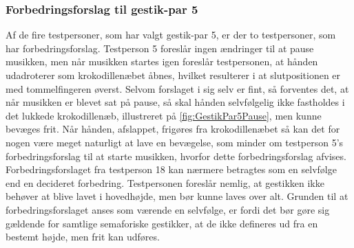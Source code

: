 \subsubsection{Forbedringsforslag til gestik-par 5}
\label{TestresultaterValgAfGestikkerForbedringGP5}
%
Af de fire testpersoner, som har valgt gestik-par 5, er der to testpersoner, som har forbedringsforslag. Testperson 5 foreslår ingen ændringer til at pause musikken, men når musikken startes igen foreslår testpersonen, at hånden udadroterer som krokodillenæbet åbnes, hvilket resulterer i at slutpositionen er med tommelfingeren øverst. Selvom forslaget i sig selv er fint, så forventes det, at når musikken er blevet sat på pause, så skal hånden selvfølgelig ikke fastholdes i det lukkede krokodillenæb, illustreret på \autoref{fig:GestikPar5Pause}, men kunne bevæges frit. Når hånden, afslappet, frigøres fra krokodillenæbet så kan det for nogen være meget naturligt at lave en bevægelse, som minder om testperson 5's forbedringsforslag til at starte musikken, hvorfor dette forbedringsforslag afvises. Forbedringsforslaget fra testperson 18 kan nærmere betragtes som en selvfølge end en decideret forbedring. Testpersonen foreslår nemlig, at gestikken ikke behøver at blive lavet i hovedhøjde, men bør kunne laves over alt. Grunden til at forbedringsforslaget anses som værende en selvfølge, er fordi det bør gøre sig gældende for samtlige semaforiske gestikker, at de ikke defineres ud fra en bestemt højde, men frit kan udføres.
%
